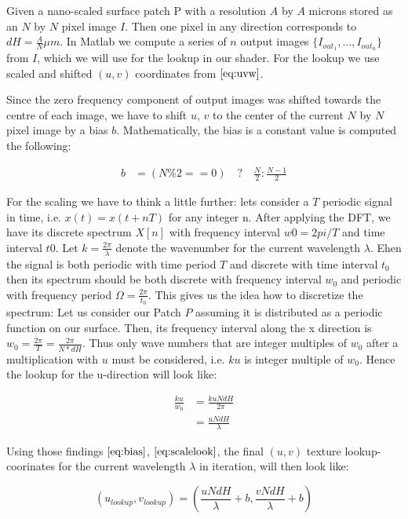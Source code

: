 Given a nano-scaled surface patch P with a resolution $A$ by $A$ microns stored as an $N$ by $N$ pixel image $I$.
Then one pixel in any direction corresponds to $dH = \frac{A}{N} \mu m$. 
In Matlab we compute a series of $n$ output images $\{I_{out_1},...,I_{out_n}\}$ from $I$, which we will use for the lookup in our shader. For the lookup we use scaled and shifted $(u,v)$ coordinates from $\ref{eq:uvw}$. 

Since the zero frequency component of output images was shifted towards the centre of each image, we have to shift $u$, $v$ to the center of the current $N$ by $N$ pixel image by a bias $b$. Mathematically, the bias is a constant value is computed the following:

\begin{align}
    b
    &= (N \% 2 == 0) \quad ? \quad \frac{N}{2} : \frac{N-1}{2}
\label{eq:bias}
\end{align}

For the scaling we have to think a little further: lets consider a $T$ periodic signal in time, i.e. $x(t) = x(t+nT)$ for any integer n. After applying the DFT, we have its discrete spectrum $X[n]$ with frequency interval $w0 = 2pi / T$ and time interval $t0$. Let $k = \frac{2 \pi}{\lambda}$ denote the wavenumber for the current wavelength $\lambda$.
Ehen the signal is both periodic with time period $T$ and discrete with time interval $t_0$ then its spectrum should be both discrete with frequency interval $w_0$ and periodic with frequency period $\Omega = \frac{2 \pi}{t_0}$. This gives us the idea how to discretize the spectrum: Let us consider our Patch $P$ assuming it is distributed as a periodic function on our surface. Then, its frequency interval along the x direction is $w_0 = \frac{2 \pi}{T} = \frac{2 \pi}{N*dH}$. 
Thus only wave numbers that are integer multiples of $w_0$ after a multiplication with $u$ must be considered, i.e. $ku$ is integer multiple of $w_0$. Hence the lookup for the u-direction will look like:

\begin{align}
    \frac{ku}{w_0} 
    &= \frac{ku N dH}{2 \pi} \\
    &= \frac{u N dH}{\lambda}
\label{eq:scalelook}
\end{align}

Using those findings $\ref{eq:bias}$, $\ref{eq:scalelook}$, the final $(u,v)$ texture lookup-coorinates for the current wavelength $\lambda$ in iteration, will then look like:

\begin{equation}
  (u_{lookup}, v_{lookup}) = \left( \frac{u N dH}{\lambda} + b, \frac{v N dH}{\lambda} + b \right)
\label{eq:ublookup}
\end{equation}  

